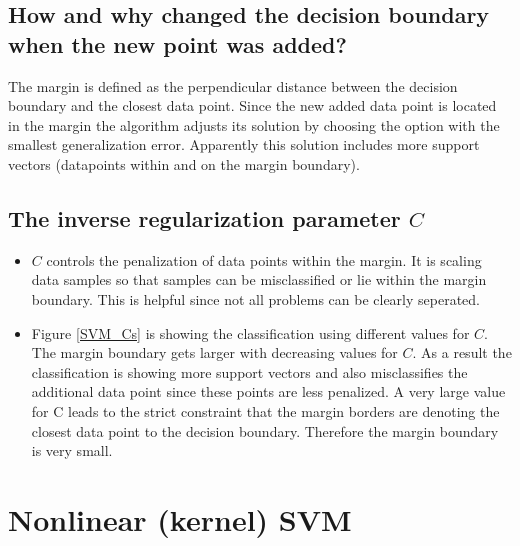 \documentclass{article}
\begin{document}
\subsection{How and why changed the decision boundary when the new point was added?}

The margin is defined as the perpendicular distance between the decision boundary and the closest data point. Since the new added data point is located in the margin the algorithm adjusts its solution by choosing the option with the smallest generalization error. Apparently this solution includes more support vectors (datapoints within and on the margin boundary).

\subsection{The inverse regularization parameter $C$}

\begin{itemize}

	\item $C$ controls the penalization of data points within the margin. It is scaling data samples so that samples can be misclassified or lie within the margin boundary. This is helpful since not all problems can be clearly seperated.

	\item Figure \ref{SVM_Cs} is showing the classification using different values for $C$. The margin boundary gets larger with decreasing values for $C$. As a result the classification is showing more support vectors and also misclassifies the additional data point since these points are less penalized.
	    A very large value for C leads to the strict constraint that the margin borders are denoting the closest data point to the decision boundary. Therefore the margin boundary is very small.

\end{itemize}


\section{Nonlinear (kernel) SVM}

\subsection{}

\subsection{}
\end{document}
